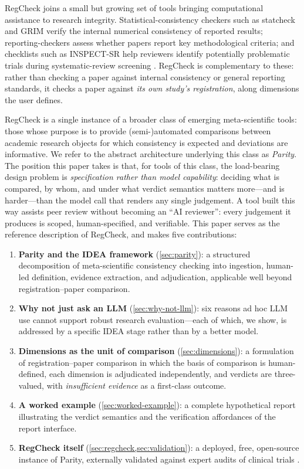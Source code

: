 \documentclass{article}
\begin{document}
RegCheck joins a small but growing set of tools bringing computational
assistance to research integrity. Statistical-consistency checkers such as
statcheck and GRIM verify the internal numerical consistency of reported
results; reporting-checkers assess whether papers report key methodological
criteria; and checklists such as INSPECT-SR help reviewers identify potentially
problematic trials during systematic-review screening
\citep{wilkinson_inspect-sr_2025}. RegCheck is complementary to these: rather
than checking a paper against internal consistency or general reporting
standards, it checks a paper against \emph{its own study's registration}, along
dimensions the user defines.

RegCheck is a single instance of a broader class of emerging meta-scientific
tools: those whose purpose is to provide (semi-)automated comparisons between
academic research objects for which consistency is expected and deviations are
informative. We refer to the abstract architecture underlying this class as
\emph{Parity}. The position this paper takes is that, for tools of this class,
the load-bearing design problem is \emph{specification rather than model
capability}: deciding what is compared, by whom, and under what verdict
semantics matters more---and is harder---than the model call that renders any
single judgement. A tool built this way assists peer review without becoming an
``AI reviewer'': every judgement it produces is scoped, human-specified, and
verifiable. This paper serves as the reference description of RegCheck, and
makes five contributions:
\begin{enumerate}
  \item \textbf{Parity and the IDEA framework} (\cref{sec:parity}): a structured
  decomposition of meta-scientific consistency checking into ingestion,
  human-led definition, evidence extraction, and adjudication, applicable well
  beyond registration--paper comparison.
  \item \textbf{Why not just ask an LLM} (\cref{sec:why-not-llm}): six reasons
  ad hoc LLM use cannot support robust research evaluation---each of which, we
  show, is addressed by a specific IDEA stage rather than by a better model.
  \item \textbf{Dimensions as the unit of comparison} (\cref{sec:dimensions}): a
  formulation of registration--paper comparison in which the basis of comparison
  is human-defined, each dimension is adjudicated independently, and verdicts
  are three-valued, with \emph{insufficient evidence} as a first-class outcome.
  \item \textbf{A worked example} (\cref{sec:worked-example}): a complete
  hypothetical report illustrating the verdict semantics and the verification
  affordances of the report interface.
  \item \textbf{RegCheck itself} (\cref{sec:regcheck,sec:validation}): a
  deployed, free, open-source instance of Parity, externally validated against
  expert audits of clinical trials \citep{cummins_automating_2026}.
\end{enumerate}
\end{document}
